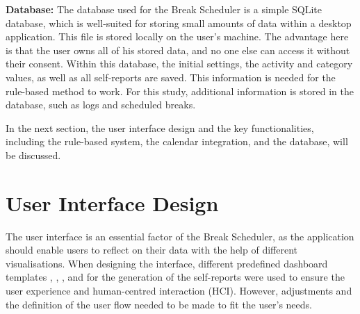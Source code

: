 \documentclass{hasel_thesis}
\begin{document}
\textbf{Database:} The database used for the Break Scheduler is a simple SQLite database, which is well-suited for storing small amounts of data within a desktop application. This file is stored locally on the user's machine. The advantage here is that the user owns all of his stored data, and no one else can access it without their consent. Within this database, the initial settings, the activity and category values, as well as all self-reports are saved. This information is needed for the rule-based method to work. For this study, additional information is stored in the database, such as logs and scheduled breaks.

In the next section, the user interface design and the key functionalities, including the rule-based system, the calendar integration, and the database, will be discussed.

\section{User Interface Design} \label{interface}

The user interface is an essential factor of the Break Scheduler, as the application should enable users to reflect on their data with the help of different visualisations. When designing the interface, different predefined dashboard templates \cite{startAdmin}, \cite{codyhouse}, \cite{radiance}, and \cite{nicepage} for the generation of the self-reports 
were used to ensure the user experience and human-centred interaction (HCI). However, adjustments and the definition of the user flow needed to be made to fit the user's needs.
\end{document}
